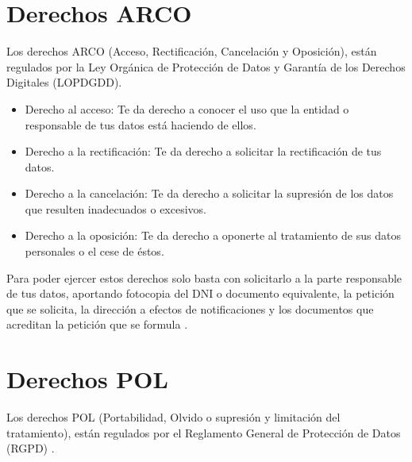 \documentclass[
  a4paper,
  openany]{book}
\begin{document}
\hypertarget{derechos-arco}{%
\section{Derechos ARCO}\label{derechos-arco}}

Los derechos ARCO (Acceso, Rectificación, Cancelación y Oposición), están regulados por la Ley Orgánica de Protección de Datos y Garantía de los Derechos Digitales (LOPDGDD).

\begin{itemize}
\item
  Derecho al acceso: Te da derecho a conocer el uso que la entidad o responsable de tus datos está haciendo de ellos.
\item
  Derecho a la rectificación: Te da derecho a solicitar la rectificación de tus datos.
\item
  Derecho a la cancelación: Te da derecho a solicitar la supresión de los datos que resulten inadecuados o excesivos.
\item
  Derecho a la oposición: Te da derecho a oponerte al tratamiento de sus datos personales o el cese de éstos.
\end{itemize}

Para poder ejercer estos derechos solo basta con solicitarlo a la parte responsable de tus datos, aportando fotocopia del DNI o documento equivalente, la petición que se solicita, la dirección a efectos de notificaciones y los documentos que acreditan la petición que se formula \citep{arco}.

\hypertarget{derechos-pol}{%
\section{Derechos POL}\label{derechos-pol}}

Los derechos POL (Portabilidad, Olvido o supresión y limitación del tratamiento), están regulados por el Reglamento General de Protección de Datos (RGPD) \citep{pol}.
\end{document}
